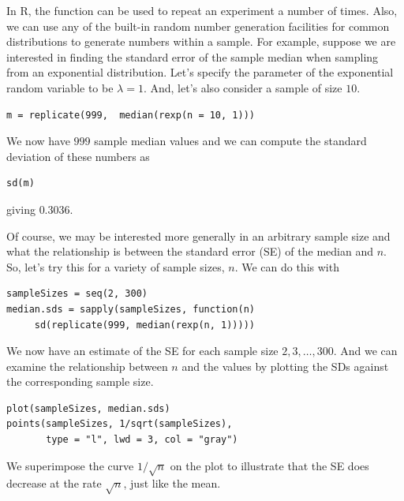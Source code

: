 In R, the function  can be used to repeat an
experiment a number of times.  Also, we can use any of the built-in
random number generation facilities for common distributions to
generate numbers within a sample.  For example, suppose we are
interested in finding the standard error of the sample median
when sampling from an exponential distribution.
Let's specify the parameter of the  exponential 
random variable to be $\lambda = 1$.
And, let's also consider a sample of size $10$.
{\footnotesize{
\begin{verbatim}
m = replicate(999,  median(rexp(n = 10, 1)))
\end{verbatim}
}}
We now have $999$ sample median values
and we can compute the standard deviation of these numbers
as
\begin{verbatim}
sd(m)
\end{verbatim}
giving $0.3036$.

Of course, we may be interested more generally in an
arbitrary sample size and what the relationship is
between the standard error (SE) of the median and $n$.
So, let's try this for a variety of sample sizes, $n$.
We can do this with
\begin{verbatim}
sampleSizes = seq(2, 300)
median.sds = sapply(sampleSizes, function(n) 
     sd(replicate(999, median(rexp(n, 1)))))
\end{verbatim}
We now have an estimate of the SE for each sample size $2, 3, \ldots, 300$.
And we can examine the relationship between $n$ and the values
by plotting the SDs against the corresponding sample size.
\begin{verbatim}
plot(sampleSizes, median.sds)
points(sampleSizes, 1/sqrt(sampleSizes),
       type = "l", lwd = 3, col = "gray")
\end{verbatim}
We superimpose the curve  $1/\sqrt{n}$ on the plot
to illustrate that the SE does decrease at the rate
$\sqrt{n}$, just like the mean.

